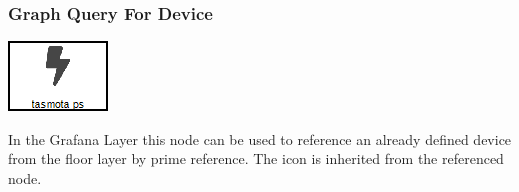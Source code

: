 \subsubsection{Graph Query For Device}
\noindent\begin{minipage}{0.15\textwidth}%
	\includegraphics[width=\linewidth]{assets/images/sensor}
\end{minipage}%
\hfill%
\begin{minipage}{0.8\textwidth}
	In the Grafana Layer this node can be used to reference an already defined device from the floor layer by prime reference. The icon is inherited from the referenced node.
\end{minipage}

